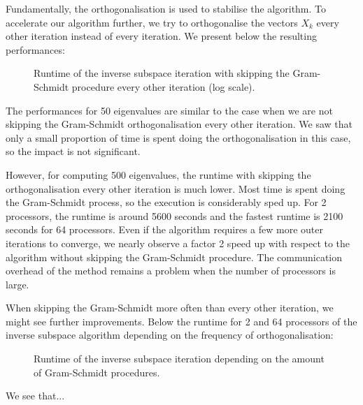 Fundamentally, the orthogonalisation is used to stabilise the algorithm.
To accelerate our algorithm further, we try to orthogonalise the vectors \(X_k\) every other iteration instead of every iteration.
We present below the resulting performances:

\begin{figure}[H]
  \centering
  
  \caption{Runtime of the inverse subspace iteration with skipping the Gram-Schmidt procedure every other iteration (log scale).}
\end{figure}

The performances for 50 eigenvalues are similar to the case when we are not skipping the Gram-Schmidt orthogonalisation every other iteration.
We saw that only a small proportion of time is spent doing the orthogonalisation in this case, so the impact is not significant.

However, for computing 500 eigenvalues, the runtime with skipping the orthogonalisation every other iteration is much lower.
Most time is spent doing the Gram-Schmidt process, so the execution is considerably sped up.
For 2 processors, the runtime is around 5600 seconds and the fastest runtime is 2100 seconds for 64 processors.
Even if the algorithm requires a few more outer iterations to converge, we nearly observe a factor 2 speed up with respect to the algorithm without skipping the Gram-Schmidt procedure.
The communication overhead of the method remains a problem when the number of processors is large.

When skipping the Gram-Schmidt more often than every other iteration, we might see further improvements.
Below the runtime for 2 and 64 processors of the inverse subspace algorithm depending on the frequency of orthogonalisation:

\begin{figure}[H]
  \centering
  
  \caption{Runtime of the inverse subspace iteration depending on the amount of Gram-Schmidt procedures.}
\end{figure}

We see that...
